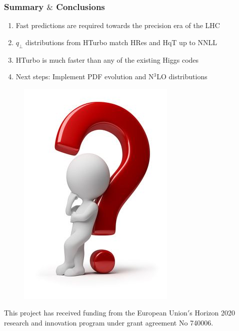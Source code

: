 \documentclass[aspectratio=43]{beamer}
\begin{document}
\begin{frame}
	
	\frametitle{Summary $\&$ Conclusions}

	\vspace{2.0 cm}
	
	\begin{enumerate}
		\item Fast predictions are required towards the precision era of the LHC
		\item $q_{\perp}$ distributions from HTurbo {\color{blue}match HRes and HqT up to NNLL}
		\item HTurbo is {\color{blue}much faster than any of the existing Higgs codes}
		\item Next steps: Implement PDF evolution and {\color{blue}N$^{3}$LO distributions}

	\end{enumerate}

	\vspace{2.0 cm}

\end{frame}

\begin{frame}


	\begin{figure}
		\includegraphics[width = 4 cm]{plots/thinking.png}
	\end{figure}		

	{\small \color{blue} This project has received funding from the European Union$'$s Horizon 2020 research and innovation program under grant agreement No 740006.}

\end{frame}
\end{document}
